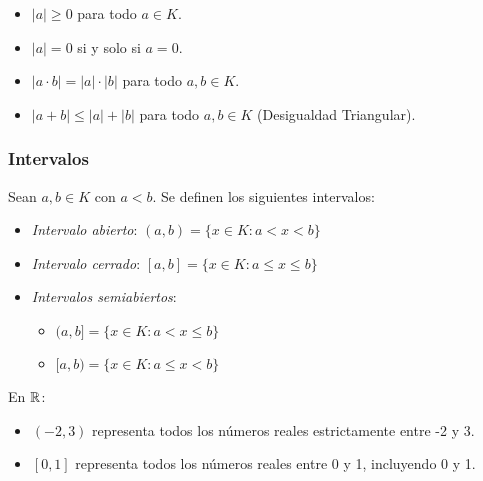 \begin{itemize}
	\item $|a| \geq 0$ para todo $a \in K$.
	\item $|a| = 0$ si y solo si $a = 0$.
	\item $|a \cdot b| = |a| \cdot |b|$ para todo $a, b \in K$.
	\item $|a + b| \leq |a| + |b|$ para todo $a, b \in K$ (Desigualdad Triangular).
\end{itemize}

\subsubsection{Intervalos}

Sean $a, b \in K$ con $a < b$. Se definen los siguientes intervalos:

\begin{itemize}
	\item \textit{Intervalo abierto}: $(a, b) = \{x \in K : a < x < b\}$
	\item \textit{Intervalo cerrado}: $[a, b] = \{x \in K : a \leq x \leq b\}$
	\item \textit{Intervalos semiabiertos}:
	\begin{itemize}
		\item $(a, b] = \{x \in K : a < x \leq b\}$
		\item $[a, b) = \{x \in K : a \leq x < b\}$
	\end{itemize}
\end{itemize}

\begin{fmd-example}[Intervalos]
	En $\mathbb{R}$:
	\begin{itemize}
		\item $(-2, 3)$ representa todos los números reales estrictamente entre -2 y 3.
		\item $[0, 1]$ representa todos los números reales entre 0 y 1, incluyendo 0 y 1.
	\end{itemize}
\end{fmd-example}




